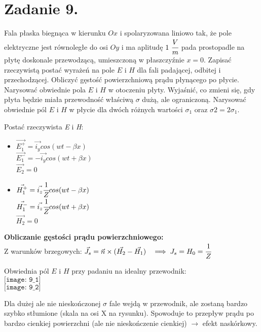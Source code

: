 \section*{Zadanie 9.}
\begin{task}
Fala płaska biegnąca w kierunku $Ox$ i spolaryzowana liniowo tak, że pole elektryczne jest równoległe do osi $Oy$ i ma aplitudę $1\ \cfrac{V}{m}$ pada prostopadle na płytę doskonale przewodzącą, umieszczoną w płaszczyźnie $x=0$. Zapisać rzeczywistą postać wyrażeń na pole $E$ i $H$ dla fali padającej, odbitej i przechodzącej. Obliczyć gęstość powierzchniową prądu płynącego po płycie. Narysować obwiednie pola $E$ i $H$ w otoczeniu płyty. Wyjaśnić, co zmieni się, gdy płyta będzie miała przewodność właściwą $\sigma$ dużą, ale ograniczoną. Narysować obwiednie pól $E$ i $H$ w płycie dla dwóch różnych wartości $\sigma_{1}$ oraz $\sigma{2}=2\sigma_{1}$.\\
\end{task}

\begin{solution}
Postać rzeczywista \textsl{E} i \textsl{H}:
\begin{itemize}
\item $\vec{E^{+}_{1}}=\vec{i_{y}}cos(wt-\beta x)$\\
       $\vec{E^{-}_{1}}=-\vec{i_{y}}cos(wt+\beta x)$\\
       $\vec{E_{2}}=0$
\item $\vec{H^{+}_{1}}=\vec{i_{z}}\cfrac{1}{Z}cos(wt-\beta x)$\\
       $\vec{H^{-}_{1}}=\vec{i_{z}}\cfrac{1}{Z}cos(wt+\beta x)$\\
       $\vec{H_{2}}=0$\\
\end{itemize}
\textbf{Obliczanie gęstości prądu powierzchniowego:}\\
Z warunków brzegowych: $\vec{J_{s}}=\vec{n}\times(\vec{H_{2}}-\vec{H_1})\ \ \implies J_{s}=H_{0}=\cfrac{1}{Z}$

\begin{center}
Obwiednia pól $E$ i $H$ przy padaniu na idealny przewodnik:\\
$\texttt{[image: 9\_1]}$\\

$\texttt{[image: 9\_2]}$\\
\end{center}
Dla dużej ale nie nieskończonej $\sigma$ fale wejdą w przewodnik, ale zostaną bardzo szybko stłumione (skala na osi X na rysunku). Spowoduje to przepływ prądu po bardzo cienkiej powierzchni (ale nie nieskończenie cienkiej) $\rightarrow$ efekt naskórkowy.

\end{solution}